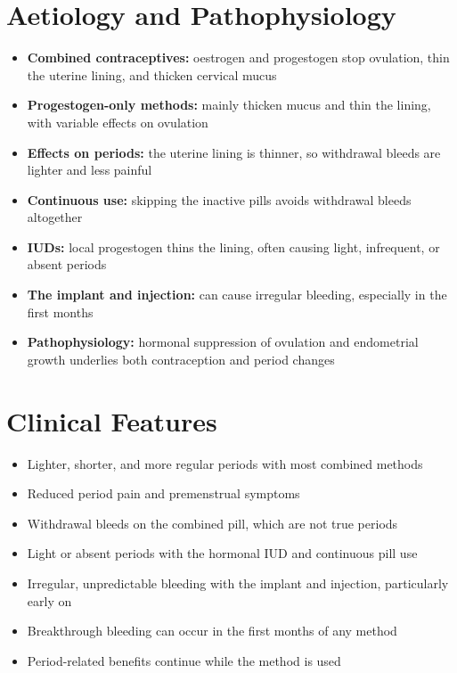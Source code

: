 \section*{Aetiology and Pathophysiology}
\begin{itemize}
    \item \textbf{Combined contraceptives:} oestrogen and progestogen stop ovulation, thin the uterine lining, and thicken cervical mucus
    \item \textbf{Progestogen-only methods:} mainly thicken mucus and thin the lining, with variable effects on ovulation
    \item \textbf{Effects on periods:} the uterine lining is thinner, so withdrawal bleeds are lighter and less painful
    \item \textbf{Continuous use:} skipping the inactive pills avoids withdrawal bleeds altogether
    \item \textbf{IUDs:} local progestogen thins the lining, often causing light, infrequent, or absent periods
    \item \textbf{The implant and injection:} can cause irregular bleeding, especially in the first months
    \item \textbf{Pathophysiology:} hormonal suppression of ovulation and endometrial growth underlies both contraception and period changes
\end{itemize}

\section*{Clinical Features}
\begin{itemize}
    \item Lighter, shorter, and more regular periods with most combined methods
    \item Reduced period pain and premenstrual symptoms
    \item Withdrawal bleeds on the combined pill, which are not true periods
    \item Light or absent periods with the hormonal IUD and continuous pill use
    \item Irregular, unpredictable bleeding with the implant and injection, particularly early on
    \item Breakthrough bleeding can occur in the first months of any method
    \item Period-related benefits continue while the method is used
\end{itemize}

